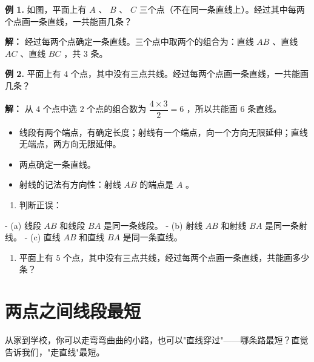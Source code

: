 \begin{workedexamples}


\textbf{例 1.} 如图，平面上有 $A$ 、 $B$ 、 $C$ 三个点（不在同一条直线上）。经过其中每两个点画一条直线，一共能画几条？

\textbf{解：} 经过每两个点确定一条直线。三个点中取两个的组合为：直线 $AB$ 、直线 $AC$ 、直线 $BC$ ，共 $3$ 条。

\textbf{例 2.} 平面上有 $4$ 个点，其中没有三点共线。经过每两个点画一条直线，一共能画几条？

\textbf{解：} 从 $4$ 个点中选 $2$ 个点的组合数为 $\dfrac{4 \times 3}{2} = 6$ ，所以共能画 $6$ 条直线。

\end{workedexamples}

\begin{keytakeaway}


\begin{itemize}
  \item 线段有两个端点，有确定长度；射线有一个端点，向一个方向无限延伸；直线无端点，两方向无限延伸。
  \item 两点确定一条直线。
  \item 射线的记法有方向性：射线 $AB$ 的端点是 $A$ 。
\end{itemize}


\end{keytakeaway}

\begin{practice}


\begin{enumerate}
  \item 判断正误：
\end{enumerate}

   - (a) 线段 $AB$ 和线段 $BA$ 是同一条线段。
   - (b) 射线 $AB$ 和射线 $BA$ 是同一条射线。
   - (c) 直线 $AB$ 和直线 $BA$ 是同一条直线。

\begin{enumerate}
  \item 平面上有 $5$ 个点，其中没有三点共线，经过每两个点画一条直线，共能画多少条？
\end{enumerate}


\end{practice}



\section*{两点之间线段最短}


\begin{explore}


从家到学校，你可以走弯弯曲曲的小路，也可以"直线穿过"——哪条路最短？直觉告诉我们，"走直线"最短。

\end{explore}

